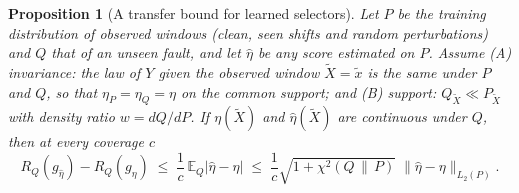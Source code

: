 \documentclass{esannV2}
\newtheorem{proposition}{Proposition}
\begin{document}
\begin{proposition}[A transfer bound for learned selectors]\label{prop:transfer}
Let $P$ be the training distribution of observed windows (clean, seen shifts and random perturbations) and $Q$ that of an unseen fault, and let $\hat\eta$ be any score estimated on $P$. Assume (A) \emph{invariance}: the law of $Y$ given the observed window $\tilde X=\tilde x$ is the same under $P$ and $Q$, so that $\eta_P=\eta_Q=\eta$ on the common support; and (B) \emph{support}: $Q_{\tilde X}\ll P_{\tilde X}$ with density ratio $w=dQ/dP$. If $\eta(\tilde X)$ and $\hat\eta(\tilde X)$ are continuous under $Q$, then at every coverage $c$
\[
R_Q(g_{\hat\eta})-R_Q(g_\eta)\;\le\;\frac1c\,\mathbb E_Q|\hat\eta-\eta|\;\le\;\frac1c\sqrt{1+\chi^2(Q\,\|\,P)}\;\big\|\hat\eta-\eta\big\|_{L_2(P)}.
\]
\end{proposition}
\end{document}

